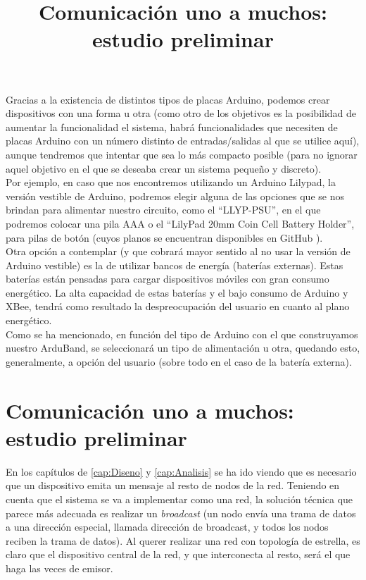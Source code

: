 Gracias a la existencia de distintos tipos de placas Arduino, podemos crear dispositivos
con una forma u otra (como otro de los objetivos es la posibilidad de aumentar la funcionalidad
el sistema, habrá funcionalidades que necesiten de placas Arduino con un número distinto de
entradas/salidas al que se utilice aquí), aunque tendremos que intentar que sea lo más compacto
posible (para no ignorar aquel objetivo en el que se deseaba crear un sistema pequeño y discreto).\\

Por ejemplo, en caso que nos encontremos utilizando un Arduino Lilypad, la versión vestible de Arduino,
podremos elegir alguna de las opciones que se nos brindan para alimentar nuestro circuito, como el “LLYP-PSU”,
en el que podremos colocar una pila AAA o el “LilyPad 20mm Coin Cell Battery Holder”, para pilas de botón (cuyos
planos se encuentran disponibles en GitHub \cite{lilypadcoin}).\\

Otra opción a contemplar (y que cobrará mayor sentido al no usar la versión de Arduino vestible)
es la de utilizar bancos de energía (baterías externas). Estas baterías están pensadas para cargar
dispositivos móviles con gran consumo energético. La alta capacidad de estas baterías y el bajo consumo
de Arduino y XBee, tendrá como resultado la despreocupación del usuario en cuanto al plano energético.\\

Como se ha mencionado, en función del tipo de Arduino con el que construyamos nuestro ArduBand,
se seleccionará un tipo de alimentación u otra, quedando esto, generalmente, a opción del usuario
(sobre todo en el caso de la batería externa).\\

\section{Comunicación uno a muchos: estudio preliminar}
\title{Comunicación uno a muchos: estudio preliminar}

En los capítulos de \ref{cap:Diseno} y \ref{cap:Analisis} se ha ido viendo que es necesario
que un dispositivo emita un mensaje al resto de nodos de la red. Teniendo en cuenta que el
sistema se va a implementar como una red, la solución técnica que parece más adecuada
es realizar un \textit{broadcast} (un nodo envía una trama de datos a una dirección
especial, llamada dirección de broadcast, y todos los nodos reciben la trama de datos). Al querer
realizar una red con topología de estrella, es claro que el dispositivo central de
la red, y que interconecta al resto, será el que haga las veces de emisor.\\


